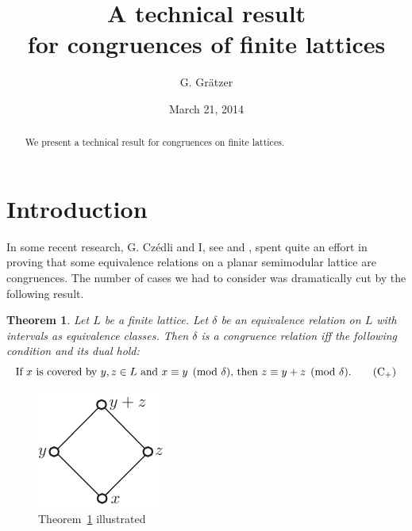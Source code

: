 \documentclass{amsart}
\newtheorem{theorem}{Theorem}
\begin{document}
\title{A technical result\\ for congruences of finite lattices}  
\author{G. Gr\"{a}tzer} 
\address{Department of Mathematics\\
  University of Manitoba\\
  Winnipeg, MB R3T 2N2\\
  Canada}
\date{March 21, 2014}
\begin{abstract}
We present a technical result
for congruences on finite lattices.
\end{abstract}
\maketitle

\section{Introduction}\label{S:Introduction}%
In some recent research, G. Cz\'edli
and I, see \cite{gC13} and \cite{GS13}, spent quite an effort
in proving that some equivalence relations 
on a planar semimodular lattice are congruences. 
The number of cases we had to consider
was dramatically cut by the following result.

\begin{theorem}\label{T:technical}%
Let $L$ be a finite lattice. 
Let $\delta$ be an equivalence relation on $L$
with intervals as equivalence classes.
Then $\delta$ is a congruence relation if{}f 
the following condition and its dual hold:
\begin{equation}\label{E:cover}%
\text{If $x$ is covered by $y,z \in L$ 
and $x \equiv y \pmod{\delta}$,
then $z \equiv y + z \pmod{\delta}$.}\tag{C${}_{+}$}
\end{equation}
\end{theorem}

\begin{figure}[hbt]
\centerline{\includegraphics{covers}}
\caption{Theorem~\ref{T:technical} illustrated}\label{T:Theorem}
\end{figure}
\end{document}
